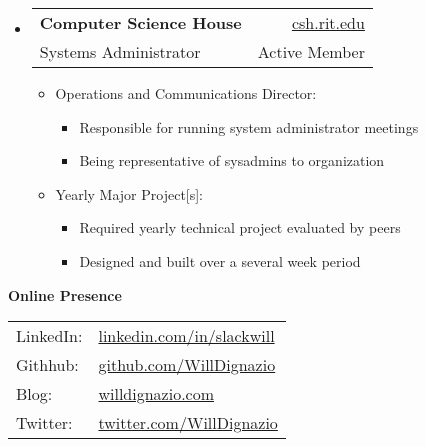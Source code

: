 \documentclass[letterpaper,11pt]{article}
\makeatletter
\newcommand{\resitem}[1]{\item #1 \vspace{-2pt}}
\newcommand{\resheading}[1]{{\large \colorbox{mygrey}{\begin{minipage}{\textwidth}{\textbf{#1 \vphantom{p\^{E}}}}\end{minipage}}}}
\newcommand{\ressubheading}[4]{
\begin{tabular*}{6.5in}{l@{\extracolsep{\fill}}r}
		\textbf{#1} & #2 \\
		{#3} & {#4} \\
\end{tabular*}\vspace{-6pt}}
\makeatother
\begin{document}
{\begin{itemize}
{				}
		\item 
			\ressubheading{Computer Science House}{\href{http://www.csh.rit.edu/}{csh.rit.edu}}{Systems Administrator}{Active Member} 
			{ \footnotesize
				\begin{itemize}		
					\resitem{Operations and Communications Director:}
						\begin{itemize}
							\item{Responsible for running system administrator meetings}
							\item{Being representative of sysadmins to organization}
						\end{itemize}
					\resitem{Yearly Major Project[s]:}
						\begin{itemize}
							\item{Required yearly technical project evaluated by peers}
							\item{Designed and built over a several week period}
						\end{itemize}
				\end{itemize}
			}		
	\end{itemize}  %
}

\resheading{Online Presence}
{
	\begin{tabularx}{2in}{XX}
		LinkedIn: & \href{http://www.linkedin.com/in/slackwill/}{linkedin.com/in/slackwill} \\
		Githhub: & \href{http://www.github.com/WillDignazio}{github.com/WillDignazio} \\
		Blog: & \href{http://www.willdignazio.com/}{willdignazio.com} \\
		Twitter: & \href{https://twitter.com/WillDignazio}{twitter.com/WillDignazio} \\
	\end{tabularx}
}
\pagebreak
\end{document}
